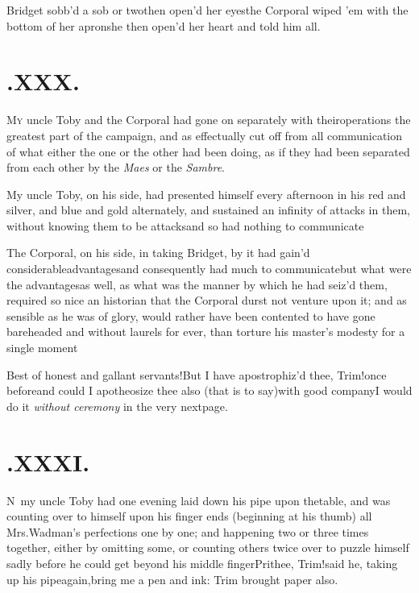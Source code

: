 \documentclass{article}
\begin{document}
Bridget sobb’d a sob or two\tsh then
open’d her eyes\tsh the Corporal wiped ’em
with the bottom of her apron\tsh\break she then open’d her
heart and told him all.

\newpage
\section{.\enspace XXX.}

\lettrine{M}{y} uncle Toby and the Corporal
had gone on separately with their\break operations the greatest part of
the campaign, and as effectually cut off from all communication of
what either the one or the other had been doing, as if they had
been separated from each other by the \textit{Maes} or the
\textit{Sambre}.

My uncle Toby, on his side, had presented himself every
afternoon in his red and silver, and blue and gold alternately, and
sustained an infinity of attacks in them, without knowing them to
be attacks\tsk and so had nothing to
communicate\tsh

\newpage
The Corporal, on his side, in taking Bridget, by it had
gain’d considerable\break advantages\tsh and consequently
had much to communicate\tsh but what were the
advantages\tsh as well, as what was the manner by which he
had seiz’d them, required so nice an historian that the
Corporal durst not venture upon it; and as sensible as he was of
glory, would rather have been contented to have gone bareheaded and
without laurels for ever, than torture his master’s modesty
for a single moment\tsh

\tsh Best of honest and gallant
servants!\tsh But I have apostrophiz’d thee,
Trim!\@ once before\tsh and could I apotheosize thee
also (that is to say)\pb with good company\tsh I would do it
\textit{without ceremony} in the very next\break page.

\newpage
\section{.\enspace XXXI.}

\lettrine{N}{\,} my uncle Toby had one
evening laid down his pipe upon the\break table, and was counting over to
himself upon his finger ends (beginning at his thumb) all 
Mrs.\@ Wadman’s perfections one by one; and happening two or
three times together, either by omitting some, or counting
others twice over to puzzle himself sadly before he could get
beyond his middle finger\tsh Pri\-thee, Trim!\@ said
he, taking up his pipe\break again,\thinspace\tsh bring me a pen and ink:\break
Trim brought paper also.
\end{document}
